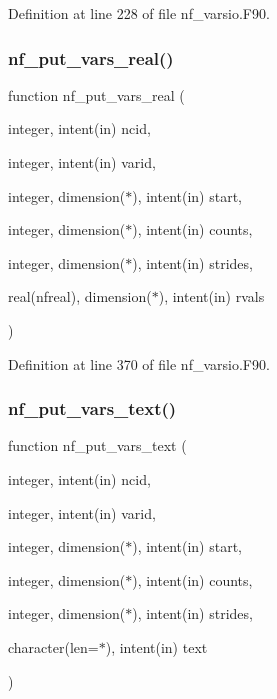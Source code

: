 Definition at line 228 of file nf\+\_\+varsio.\+F90.

\mbox{\label{nf__varsio_8F90_ada8628e3ad21d9652e908ccd541ac0d0}} 
\subsubsection{\texorpdfstring{nf\+\_\+put\+\_\+vars\+\_\+real()}{nf\_put\_vars\_real()}}
{\footnotesize\ttfamily function nf\+\_\+put\+\_\+vars\+\_\+real (\begin{DoxyParamCaption}\item[{integer, intent(in)}]{ncid,  }\item[{integer, intent(in)}]{varid,  }\item[{integer, dimension($\ast$), intent(in)}]{start,  }\item[{integer, dimension($\ast$), intent(in)}]{counts,  }\item[{integer, dimension($\ast$), intent(in)}]{strides,  }\item[{real(nfreal), dimension($\ast$), intent(in)}]{rvals }\end{DoxyParamCaption})}



Definition at line 370 of file nf\+\_\+varsio.\+F90.

\mbox{\label{nf__varsio_8F90_af36c37544feece9fa30e57ac27de71b0}} 
\subsubsection{\texorpdfstring{nf\+\_\+put\+\_\+vars\+\_\+text()}{nf\_put\_vars\_text()}}
{\footnotesize\ttfamily function nf\+\_\+put\+\_\+vars\+\_\+text (\begin{DoxyParamCaption}\item[{integer, intent(in)}]{ncid,  }\item[{integer, intent(in)}]{varid,  }\item[{integer, dimension($\ast$), intent(in)}]{start,  }\item[{integer, dimension($\ast$), intent(in)}]{counts,  }\item[{integer, dimension($\ast$), intent(in)}]{strides,  }\item[{character(len=$\ast$), intent(in)}]{text }\end{DoxyParamCaption})}




